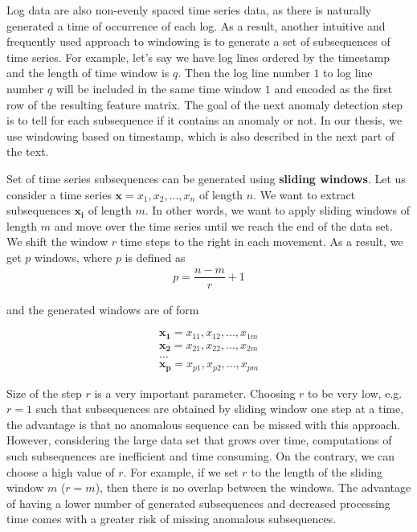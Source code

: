 Log data are also non-evenly spaced time series data, as there is naturally generated a time of occurrence of each log. As a result, another intuitive and frequently used approach to windowing is to generate a set of subsequences of time series. For example, let's say we have log lines ordered by the timestamp and the length of time window is $q$. Then the log line number $1$ to log line number $q$ will be included in the same time window $1$ and encoded as the first row of the resulting feature matrix. The goal of the next anomaly detection step is to tell for each subsequence if it contains an anomaly or not. In our thesis, we use windowing based on timestamp, which is also described in the next part of the text.

Set of time series subsequences can be generated using \textbf{sliding windows}. Let us consider a time series $\mathbf{x} = x_1, x_2, ..., x_n$ of length $n$. We want to extract subsequences $\mathbf{x_i}$ of length $m$. In other words, we want to apply sliding windows of length $m$ and move over the time series until we reach the end of the data set. We shift the window $r$ time steps to the right in each movement. As a result, we get $p$ windows, where $p$ is defined as 
    \begin{gather*}
        p = \dfrac{n - m}{r} + 1
    \end{gather*}

and the generated windows are of form 

\begin{gather*}
    \mathbf{x_1} = x_{11}, x_{12},..., x_{1m} \\
    \mathbf{x_2} = x_{21}, x_{22},..., x_{2m} \\
    \ldots\\
    \mathbf{x_p} = x_{p1}, x_{p2},..., x_{pm} 
\end{gather*}

Size of the step $r$ is a very important parameter. Choosing $r$ to be very low, e.g. $r = 1$ such that subsequences are obtained by sliding window one step at a time, the advantage is that no anomalous sequence can be missed with this approach. However, considering the large data set that grows over time, computations of such subsequences are inefficient and time consuming. On the contrary, we can choose a high value of $r$. For example, if we set $r$ to the length of the sliding window $m$ ($r = m$), then there is no overlap between the windows. The advantage of having a lower number of generated subsequences and decreased processing time comes with a greater risk of missing anomalous subsequences. 


